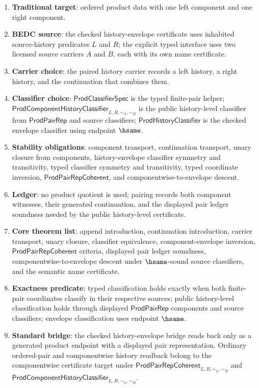 \begin{enumerate}
  \item \textbf{Traditional target}: ordered product data with one left component and one right component.
  \item \textbf{BEDC source}: the checked history-envelope certificate uses inhabited source-history predicates $L$ and $R$; the explicit typed interface uses two licensed source carriers $A$ and $B$, each with its own name certificate.
  \item \textbf{Carrier choice}: the paired history carrier records a left history, a right history, and the continuation that combines them.
  \item \textbf{Classifier choice}: $\mathsf{ProdClassifierSpec}$ is the typed finite-pair helper; $\mathsf{ProdComponentHistoryClassifier}_{L,R,\sim_L,\sim_R}$ is the public history-level classifier from $\mathsf{ProdPairRep}$ and source classifiers; $\mathsf{ProdHistoryClassifier}$ is the checked envelope classifier using endpoint $\hsame$.
  \item \textbf{Stability obligations}: component transport, continuation transport, unary closure from components, history-envelope classifier symmetry and transitivity, typed classifier symmetry and transitivity, typed coordinate inversion, $\mathsf{ProdPairRepCoherent}$, and componentwise-to-envelope descent.
  \item \textbf{Ledger}: no product quotient is used; pairing records both component witnesses, their generated continuation, and the displayed pair ledger soundness needed by the public history-level certificate.
  \item \textbf{Core theorem list}: append introduction, continuation introduction, carrier transport, unary closure, classifier equivalence, component-envelope inversion, $\mathsf{ProdPairRepCoherent}$ criteria, displayed pair ledger soundness, componentwise-to-envelope descent under $\hsame$-sound source classifiers, and the semantic name certificate.
  \item \textbf{Exactness predicate}: typed classification holds exactly when both finite-pair coordinates classify in their respective sources; public history-level classification holds through displayed $\mathsf{ProdPairRep}$ components and source classifiers; envelope classification uses endpoint $\hsame$.
  \item \textbf{Standard bridge}: the checked history-envelope bridge reads back only as a generated product endpoint with a displayed pair representation. Ordinary ordered-pair and componentwise history readback belong to the componentwise certificate target under $\mathsf{ProdPairRepCoherent}_{L,R,\sim_L,\sim_R}$ and $\mathsf{ProdComponentHistoryClassifier}_{L,R,\sim_L,\sim_R}$.

\end{enumerate}
